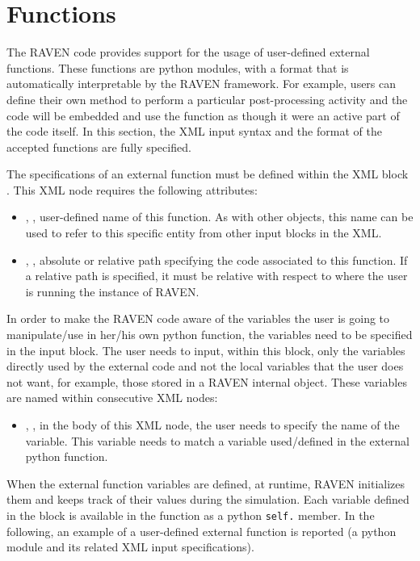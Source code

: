 \section{Functions } 
\label{sec:functions}

The RAVEN code provides support for the usage of user-defined external
functions.
%
These functions are python modules, with a format that is automatically
interpretable by the RAVEN framework.
%
For example, users can define their own method to perform a particular
post-processing activity and the code will be embedded and use the function as
though it were an active part of the code itself.
%
In this section, the XML input syntax and the format of the accepted functions
are fully specified.

The specifications of an external function must be defined within the XML block
.
%
This XML node requires the following attributes:
\vspace{-5mm}
\begin{itemize}
  \itemsep0em
  \item {}, , user-defined name
  of this function.
  \nb As with other objects, this name can be used to refer to this
  specific entity from other input blocks in the XML.
  \item {}, , absolute or
  relative path specifying the code associated to this function.
  \nb If a relative path is specified, it must be relative with respect
  to where the user is running the instance of RAVEN.
\end{itemize}
\vspace{-5mm}
In order to make the RAVEN code aware of the variables the user is going to
manipulate/use in her/his own python function, the variables need to be
specified in the  input block.
%
The user needs to input, within this block, only the variables directly used by
the external code and not the local variables that the user does not want,
for example, those stored in a RAVEN internal object.
%
These variables are named within consecutive
 XML nodes:
\begin{itemize}
  \item {}, , in the body of
  this XML node, the user needs to specify the name of the variable.
  This variable needs to match a variable used/defined in the external python
  function.
\end{itemize}
When the external function variables are defined, at runtime, RAVEN initializes
them and keeps track of their values during the simulation.
%
Each variable defined in the  block is available in the
function as a python \texttt{self.} member. In the following, an example of a
user-defined external function is reported (a python module and its related XML
input specifications).

